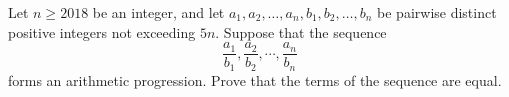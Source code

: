 Let $n \ge 2018$ be an integer, and let $a_1, a_2, \dots, a_n, b_1, b_2, \dots, b_n$ be pairwise distinct positive integers not exceeding $5n$. Suppose that the sequence $$ \dfrac{a_1}{b_1}, \dfrac{a_2}{b_2}, \cdots, \dfrac{a_n}{b_n}$$ forms an arithmetic progression. Prove that the terms of the sequence are equal.
